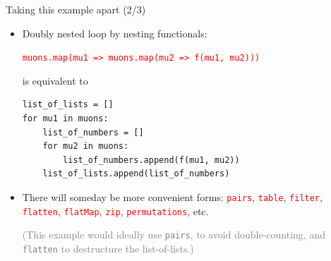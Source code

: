 \documentclass{beamer}
\begin{document}
\begin{frame}[fragile]{Taking this example apart (2/3)}
\begin{itemize}
\item Doubly nested loop by nesting functionals:

{\tt\small \textcolor{red}{muons.map(mu1 => muons.map(mu2 => f(mu1, mu2)))}}

is equivalent to

\small
\begin{verbatim}
list_of_lists = []
for mu1 in muons:
    list_of_numbers = []
    for mu2 in muons:
        list_of_numbers.append(f(mu1, mu2))
    list_of_lists.append(list_of_numbers)
\end{verbatim}

\item There will someday be more convenient forms: \textcolor{red}{\tt pairs}, \textcolor{red}{\tt table}, \textcolor{red}{\tt filter}, \textcolor{red}{\tt flatten}, \textcolor{red}{\tt flatMap}, \textcolor{red}{\tt zip}, \textcolor{red}{\tt permutations}, etc.

\vspace{0.2 cm}
\textcolor{gray}{(This example would ideally use \textcolor{lightred}{\tt pairs}, to avoid double-counting, and \textcolor{lightred}{\tt flatten} to destructure the list-of-lists.)}
\end{itemize}
\end{frame}
\end{document}
